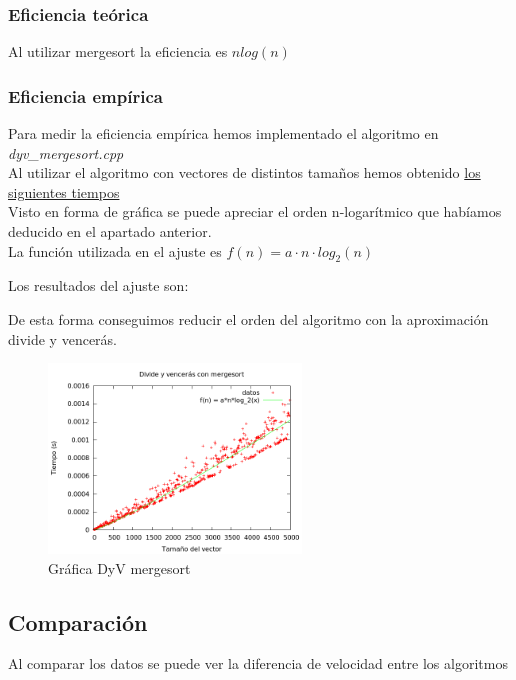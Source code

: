 \subsubsection{Eficiencia teórica}
Al utilizar mergesort la eficiencia es $nlog(n)$

\subsubsection{Eficiencia empírica}
Para medir la eficiencia empírica hemos implementado el algoritmo en \textit{dyv\_mergesort.cpp}\\

Al utilizar el algoritmo con vectores de distintos tamaños hemos obtenido \hyperref[tabla_comp]{los siguientes tiempos}\\

Visto en forma de gráfica se puede apreciar el orden n-logarítmico que habíamos deducido en el apartado anterior.\\

La función utilizada en el ajuste es $f(n) = a \cdot n \cdot log_2(n)$

Los resultados del ajuste son:\\

\begin{center}
\end{center}

De esta forma conseguimos reducir el orden del algoritmo con la aproximación divide y vencerás.

\begin{figure}[h] 
\centering
	\includegraphics[width=0.6\textwidth]{../Opcional/Graficas/dyv_mergesort_bruno.png}
	\caption{Gráfica DyV mergesort} 
	\label{fig:perros} 
\end{figure}
\newpage

\subsection{Comparación}
Al comparar los datos se puede ver la diferencia de velocidad entre los algoritmos\\

